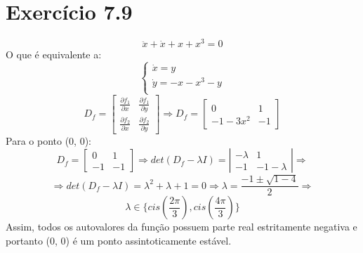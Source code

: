 \documentclass{article}[twocolumn]
\begin{document}
	\section{Exerc\'icio 7.9}
	\begin{equation}
		\ddot{x} + \dot{x} + x + x^3 = 0
		\nonumber
	\end{equation}
	O que \'e equivalente a:
	\begin{equation}
		\left\{\begin{array}{l}
			\dot{x} = y\\
			\dot{y} = -x - x^3 - y\\
		\end{array}\right.
		\nonumber
	\end{equation}
	\begin{equation}
		D_f = \left[\begin{array}{cc}
			\frac{\partial f_1}{\partial x} & \frac{\partial f_1}{\partial y}\\
			\frac{\partial f_2}{\partial x} & \frac{\partial f_2}{\partial y}
		\end{array}\right] \Rightarrow
		D_f = \left[\begin{array}{cc}
			0 & 1\\
			-1 - 3x^2 & -1
		\end{array}\right]
		\nonumber
	\end{equation}
	Para o ponto (0, 0):
	\begin{equation}
		D_f = \left[\begin{array}{cc}
			0 & 1\\
			-1 & -1
		\end{array}\right] \Rightarrow
		det(D_f - \lambda I) = \left|\begin{array}{cc}
			-\lambda & 1\\
			-1 & -1 - \lambda
		\end{array}\right| \Rightarrow
		\nonumber
	\end{equation}
	\begin{equation}
		\Rightarrow
		det(D_f - \lambda I) = \lambda^2 + \lambda + 1 = 0 \Rightarrow
		\lambda = \frac{-1 \pm \sqrt{1 - 4}}{2} \Rightarrow
		\nonumber
	\end{equation}
	\begin{equation}
		\lambda \in \{cis(\frac{2\pi}{3}), cis(\frac{4\pi}{3})\}
		\nonumber
	\end{equation}
	Assim, todos os autovalores da fun\c{c}\~ao possuem parte real estritamente negativa
	e portanto (0, 0) \'e um ponto assintoticamente est\'avel.
\end{document}
